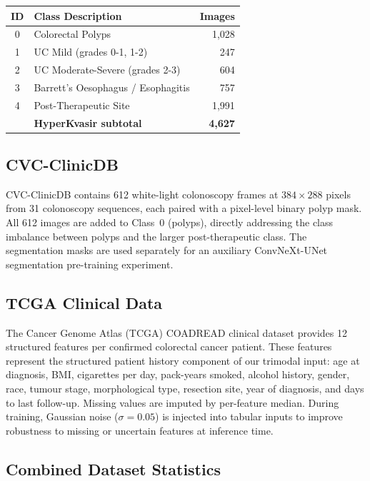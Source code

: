 \documentclass[conference]{IEEEtran}
\begin{document}
\begin{center}
\small\setlength{\tabcolsep}{3pt}
\begin{tabular}{clr}
\toprule
\textbf{ID} & \textbf{Class Description} & \textbf{Images}\\\midrule
0 & Colorectal Polyps & 1,028\\
1 & UC Mild (grades 0-1, 1-2) & 247\\
2 & UC Moderate-Severe (grades 2-3) & 604\\
3 & Barrett's Oesophagus / Esophagitis & 757\\
4 & Post-Therapeutic Site & 1,991\\\midrule
  & \textbf{HyperKvasir subtotal} & \textbf{4,627}\\
\bottomrule
\end{tabular}
\end{center}

\subsection{CVC-ClinicDB}

CVC-ClinicDB \cite{bernal2015} contains 612 white-light colonoscopy frames
at $384\!\times\!288$ pixels from 31 colonoscopy sequences, each paired with
a pixel-level binary polyp mask. All 612 images are added to Class~0 (polyps),
directly addressing the class imbalance between polyps and the larger
post-therapeutic class. The segmentation masks are used separately for an
auxiliary ConvNeXt-UNet segmentation pre-training experiment.

\subsection{TCGA Clinical Data}

The Cancer Genome Atlas (TCGA) COADREAD clinical dataset provides 12 structured
features per confirmed colorectal cancer patient. These features represent the
structured patient history component of our trimodal input: age at diagnosis,
BMI, cigarettes per day, pack-years smoked, alcohol history, gender, race,
tumour stage, morphological type, resection site, year of diagnosis, and
days to last follow-up. Missing values are imputed by per-feature median.
During training, Gaussian noise ($\sigma\!=\!0.05$) is injected into tabular
inputs to improve robustness to missing or uncertain features at inference time.

\subsection{Combined Dataset Statistics}
\end{document}

